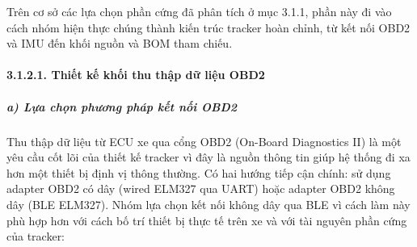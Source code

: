 \documentclass[a4paper]{extarticle}
\begin{document}
Trên cơ sở các lựa chọn phần cứng đã phân tích ở mục 3.1.1, phần này đi
vào cách nhóm hiện thực chúng thành kiến trúc tracker hoàn chỉnh, từ
kết nối OBD2 và IMU đến khối nguồn và BOM tham chiếu.

\paragraph{3.1.2.1. Thiết kế khối thu thập dữ liệu
OBD2}\label{3211-thiux1ebft-kux1ebf-muxf4-ux111un-thu-thux1eadp-dux1eef-liux1ec7u-obd2}

\subparagraph{a) Lựa chọn phương pháp kết nối
OBD2}\label{a-lux1ef1a-chux1ecdn-phux1b0ux1a1ng-phuxe1p-kux1ebft-nux1ed1i-obd2}

Thu thập dữ liệu từ ECU xe qua cổng OBD2 (On-Board Diagnostics II) là
một yêu cầu cốt lõi của thiết kế tracker vì đây là nguồn thông tin giúp
hệ thống đi xa hơn một thiết bị định vị thông thường. Có hai hướng tiếp
cận chính: sử dụng adapter OBD2 có dây (wired ELM327 qua UART) hoặc
adapter OBD2 không dây (BLE ELM327). Nhóm lựa chọn kết nối không dây qua
BLE vì cách làm này phù hợp hơn với cách bố trí thiết bị thực tế trên xe
và với tài nguyên phần cứng của tracker:
\end{document}
